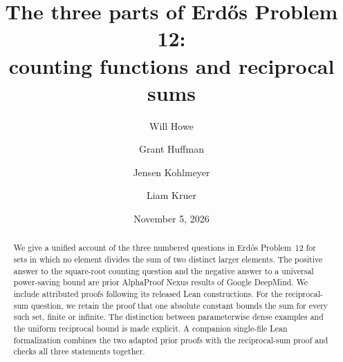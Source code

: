 \documentclass[11pt,leqno]{amsart}
\title[Erd\H{o}s Problem 12]{The three parts of Erd\H{o}s Problem 12:\\ counting functions and reciprocal sums}
\author[W. Howe]{Will Howe}
\author[G. Huffman]{Grant Huffman}
\author[J. Kohlmeyer]{Jensen Kohlmeyer}
\author[L. Kruer]{Liam Kruer}
\date{November 5, 2026}
\theoremstyle{definition}
\theoremstyle{remark}
\numberwithin{equation}{section}
\begin{document}
\begin{abstract}
We give a unified account of the three numbered questions in Erd\H{o}s
Problem~12 for sets in which no element divides the sum of two distinct
larger elements. The positive answer to the square-root counting question
and the negative answer to a universal power-saving bound are prior
AlphaProof Nexus results of Google DeepMind. We include attributed proofs
following its released Lean constructions. For the reciprocal-sum question,
we retain the proof that one absolute constant bounds the sum for every
such set, finite or infinite. The distinction between parameterwise dense
examples and the uniform reciprocal bound is made explicit. A companion
single-file Lean formalization combines the two adapted prior proofs with
the reciprocal-sum proof and checks all three statements together.
\end{abstract}
\maketitle



\end{document}
